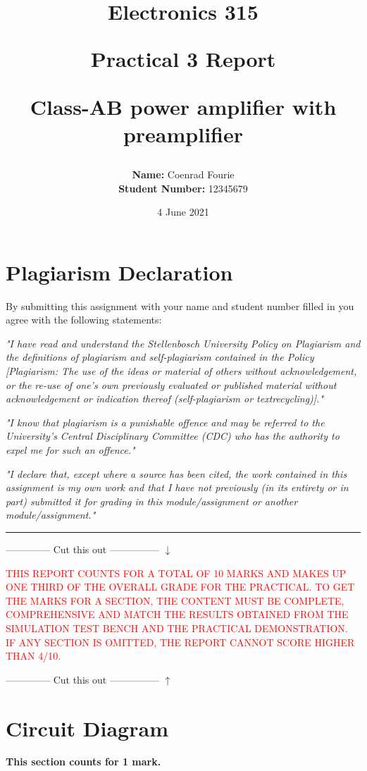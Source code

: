\documentclass{article}
\title{\Large{Electronics 315}
\Large{\centerline{\textbf{Practical 3 Report}}}
\large{\centerline{\textbf{Class-AB power amplifier with preamplifier}}}
}
\author{\large{\textbf{Name:} Coenrad Fourie}
\large{\centerline{\textbf{Student Number:} 12345679}}}
\date{4 June 2021}
\begin{document}
\maketitle
\setlength{\parindent}{0pt}
\setlength{\parskip}{1em}

\section{Plagiarism Declaration}
By submitting this assignment with your name and student number filled in you agree with the following statements:

\textit{"I have read and understand the Stellenbosch University Policy on Plagiarism and the definitions of plagiarism and self-plagiarism contained in the Policy [Plagiarism: The use of the ideas or material of others without acknowledgement, or the re-use of one’s own previously evaluated or published material without acknowledgement or indication thereof (self-plagiarism or textrecycling)]."}

\textit{"I know that plagiarism is a punishable offence and may be referred to the University's Central Disciplinary Committee (CDC) who has the authority to expel me for such an offence."}

\textit{"I declare that, except where a source has been cited, the work contained in this assignment is my own work and that I have not previously (in its entirety or in part) submitted it for grading in this module/assignment or another module/assignment."}

\hrule

--------------  Cut this out --------------- $\downarrow$

\textcolor{red}{THIS REPORT COUNTS FOR A TOTAL OF 10 MARKS AND MAKES UP ONE THIRD OF THE OVERALL GRADE FOR THE PRACTICAL. TO GET THE MARKS FOR A SECTION, THE CONTENT MUST BE COMPLETE, COMPREHENSIVE AND MATCH THE RESULTS OBTAINED FROM THE SIMULATION TEST BENCH AND THE PRACTICAL DEMONSTRATION. IF ANY SECTION IS OMITTED, THE REPORT CANNOT SCORE HIGHER THAN 4/10.}

--------------  Cut this out --------------- $\uparrow$


\section{Circuit Diagram}
\textbf{This section counts for 1 mark.}
\end{document}
